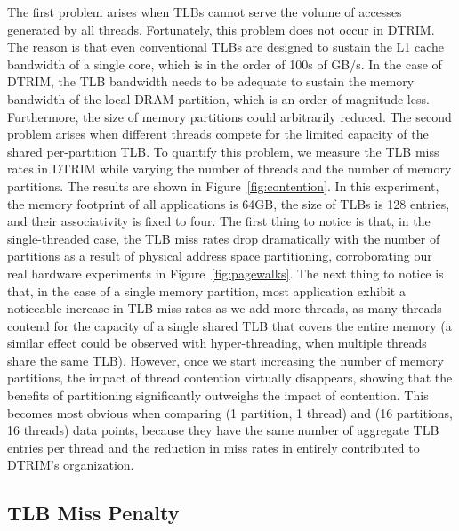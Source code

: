 The first problem arises when TLBs cannot serve the volume of accesses generated by all threads. Fortunately, this problem does not occur in DTRIM. The reason is that even conventional TLBs are designed to sustain the L1 cache bandwidth of a single core, which is in the order of 100s of GB/s. In the case of DTRIM, the TLB bandwidth needs to be adequate to sustain the memory bandwidth of the local DRAM partition, which is an order of magnitude less. Furthermore, the size of memory partitions could arbitrarily reduced. The second problem arises when different threads compete for the limited capacity of the shared per-partition TLB. To quantify this problem, we measure the TLB miss rates in DTRIM while varying the number of threads and the number of memory partitions. The results are shown in Figure~\ref{fig:contention}. In this experiment, the memory footprint of all applications is 64GB, the size of TLBs is 128 entries, and their associativity is fixed to four. The first thing to notice is that, in the single-threaded case, the TLB miss rates drop dramatically with the number of partitions as a result of physical address space partitioning, corroborating our real hardware experiments in Figure~\ref{fig:pagewalks}. The next thing to notice is that, in the case of a single memory partition, most application exhibit a noticeable increase in TLB miss rates as we add more threads, as many threads contend for the capacity of a single shared TLB that covers the entire memory (a similar effect could be observed with hyper-threading, when multiple threads share the same TLB). However, once we start increasing the number of memory partitions, the impact of thread contention virtually disappears, showing that the benefits of partitioning significantly outweighs the impact of contention. This becomes most obvious when comparing (1 partition, 1 thread) and (16 partitions, 16 threads) data  points, because they have the same number of aggregate TLB entries per thread and the reduction in miss rates in entirely contributed to DTRIM's organization. 

\subsection{TLB Miss Penalty}

